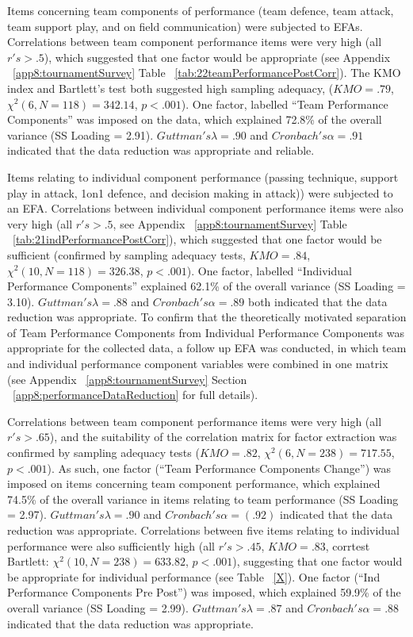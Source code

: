 \begin{CJK}{UTF8}{gbsn}
Items concerning team components of performance (team defence, team attack, team support play, and on field communication) were subjected to EFAs.  Correlations between team component performance items were very high (all $r's > .5$), which suggested that one factor would be appropriate (see Appendix ~\ref{app8:tournamentSurvey} Table ~\ref{tab:22teamPerformancePostCorr}). The KMO index and Bartlett's test both suggested high sampling adequacy, ($KMO = .79$, $\chi^2(6, N = 118) = 342.14$, $p < .001$).  One factor, labelled ``Team Performance Components'' was imposed on the data, which explained 72.8\% of the overall variance (SS Loading = 2.91). $Guttman's \lambda =.90$ and $Cronbach's\alpha = .91$ indicated that the data reduction was appropriate and reliable.

Items relating to individual component performance (passing technique, support play in attack, 1on1 defence, and decision making in attack))  were subjected to an EFA.  Correlations between individual component performance items were also very high (all $r's > .5$, see Appendix ~\ref{app8:tournamentSurvey} Table ~\ref{tab:21indPerformancePostCorr}), which suggested that one factor would be sufficient (confirmed by sampling adequacy tests, $KMO =  .84$, $\chi^2(10, N = 118) =  326.38$, $p < .001$).  One factor, labelled ``Individual Performance Components'' explained 62.1\% of the overall variance (SS Loading = 3.10).
$Guttman's \lambda =.88$ and $Cronbach's  \alpha = .89$ both indicated that the data reduction was appropriate.  To confirm that the theoretically motivated separation of Team Performance Components from Individual Performance Components was appropriate for the collected data, a follow up EFA was conducted, in which team and individual performance component variables were combined in one matrix (see Appendix ~\ref{app8:tournamentSurvey} Section ~\ref{app8:performanceDataReduction} for full details).

Correlations between team component performance items were very high (all $r's > .65$), and the suitability of the correlation matrix for factor extraction was confirmed by sampling adequacy tests ($KMO = .82$, $\chi^2(6, N = 238) = 717.55$, $p < .001$).  As such, one factor (``Team Performance Components Change'') was imposed on items concerning team component performance, which explained 74.5\% of the overall variance in items relating to team performance (SS Loading = 2.97). $Guttman's \lambda =.90$ and $Cronbach's \alpha = (.92)$ indicated that the data reduction was appropriate.  Correlations between five items relating to individual performance were also sufficiently high (all $r's > .45$, $KMO = .83$, corrtest Bartlett: $\chi^2(10, N = 238) = 633.82$, $p < .001$), suggesting that one factor would be appropriate for individual performance (see Table ~\ref{X}).  One factor (``Ind Performance Components Pre Post'') was imposed, which explained 59.9\% of the overall variance (SS Loading = 2.99).  $Guttman's\lambda =.87$ and $Cronbach's \alpha = .88$ indicated that the data reduction was appropriate.



\end{CJK}
